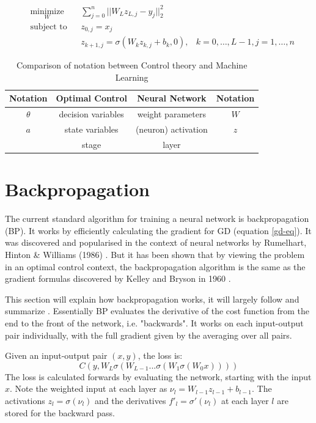 \begin{equation}
	\begin{aligned}
	& \underset{W}{\text{minimize}}
	& & \sum\limits_{j=0}^{n}||W_Lz_{L,j} - y_j||^2_2 \\
	& \text{subject to}
	& & z_{0,j} = x_j \\
	& & & z_{k+1,j} = \sigma(W_kz_{k,j} + b_k,0), &k = 0,\ldots,L-1,j = 1,\ldots,n
	\end{aligned}
	\label{ocp-eq}
\end{equation}


\begin{table}
\centering
\begin{tabular}{c | c | c | c}
Notation & Optimal Control & Neural Network & Notation\\ \hline
$\theta$ & decision variables & weight parameters & $W$\\
$a$ & state variables & (neuron) activation & $z$\\
& stage & layer \\
\end{tabular}
\caption{Comparison of notation between Control theory and Machine Learning}
\label{trans-tbl}
\end{table}


\section{Backpropagation}
The current standard algorithm for training a neural network is backpropagation (BP). It works by efficiently calculating the gradient for GD (equation \ref{gd-eq}). It was discovered and popularised in the context of neural networks by Rumelhart, Hinton \& Williams (1986) \cite{Rumelhart1986}. But it has been shown that by viewing the problem in an optimal control context, the backpropagation algorithm is the same as the gradient formulas discovered by Kelley and Bryson in 1960 \cite{dreyfus1990}.

This section will explain how backpropagation works, it will largely follow and summarize \cite{Nielsen2015}. Essentially BP evaluates the derivative of the cost function from the end to the front of the network, i.e. "backwards". It works on each input-output pair individually, with the full gradient given by the averaging over all pairs.

Given an input-output pair $(x,y)$, the loss is:
\begin{equation}
C(y,W_L\sigma(W_{L-1}...\sigma(W_1\sigma(W_0x))))
\end{equation}
The loss is calculated forwards by evaluating the network, starting with the input $x$. Note the weighted input at each layer as $\nu_l = W_{l-1}z_{l-1} + b_{l-1}$. The activations $z_l = \sigma(\nu_l)$ and the derivatives $f'_l = \sigma'(\nu_l)$ at each layer $l$ are stored for the backward pass.

